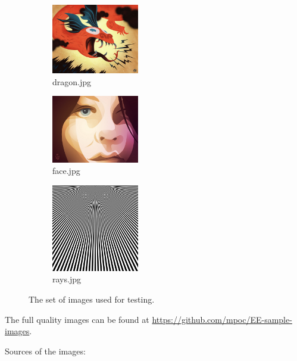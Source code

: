 \documentclass[12pt]{article}
\begin{document}
\begin{figure}[H]
	\begin{subfigure}[b]{0.26\textwidth}
		\includegraphics[width = 1.5in]{dragon.jpg}
		\caption{dragon.jpg}
	\end{subfigure}%
	\begin{subfigure}[b]{0.26\textwidth}
		\includegraphics[width = 1.5in]{face.jpg}
		\caption{face.jpg}
	\end{subfigure}%
	\begin{subfigure}[b]{0.26\textwidth}
		\includegraphics[width = 1.5in]{rays.jpg}
		\caption{rays.jpg}
	\end{subfigure}
	\caption{The set of images used for testing.}
	\label{imageMatrix}
\end{figure}
The full quality images can be found at \url{https://github.com/mpoc/EE-sample-images}.

Sources of the images:
\end{document}
